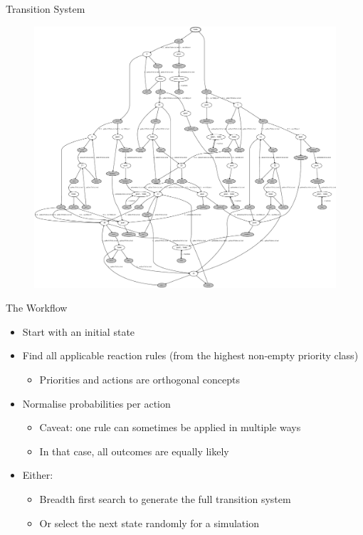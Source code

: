 \documentclass{beamer}
\begin{document}
\begin{frame}{Transition System}
  \begin{figure}
    \centering
    \includegraphics[scale=0.17]{../models/agent1/ts.pdf}
  \end{figure}
\end{frame}

\begin{frame}{The Workflow}
  \begin{itemize}
  \item Start with an initial state
    \pause
  \item Find all applicable reaction rules (from the highest non-empty priority
    class)
    \begin{itemize}
    \item Priorities and actions are orthogonal concepts
    \end{itemize}
    \pause
  \item Normalise probabilities per action
    \pause
    \begin{itemize}
    \item Caveat: one rule can sometimes be applied in multiple ways
    \item In that case, all outcomes are equally likely
    \end{itemize}
    \pause
  \item Either:
    \begin{itemize}
    \item Breadth first search to generate the full transition system
    \item Or select the next state randomly for a simulation
    \end{itemize}
  \end{itemize}
\end{frame}
\end{document}

